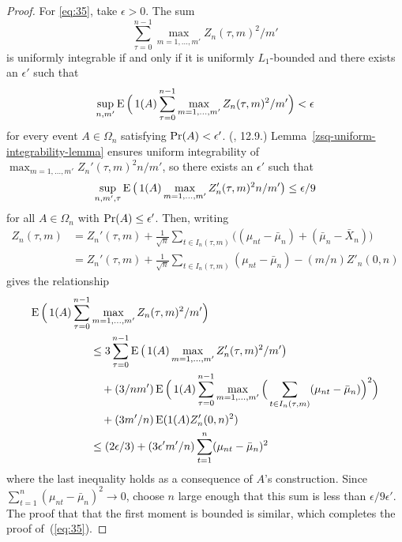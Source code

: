 \documentclass[11pt]{article}
\begin{document}
\begin{proof}
  For \eqref{eq:35}, take $\epsilon > 0$. The sum
  \[
  \sum_{\tau=0}^{n-1} \max_{m=1,\dots,m'} Z_n(\tau, m)^2 / m'
  \]
  is uniformly integrable if and only if it is uniformly $L_1$-bounded
  and there exists an $\epsilon'$ such that
  \[
  \sup_{n, m'} \operatorname{E}\Big( \operatorname{1}(A) \sum_{\tau=0}^{n-1} \max_{m=1,\dots,m'} Z_n(\tau, m)^2 / m' \Big)
  < \epsilon
  \]
  for every event $A \in \Omega_n$ satisfying $\operatorname{Pr}(A) < \epsilon'$.
  (\citealp{Dav:94}, 12.9.)
  Lemma~\ref{zsq-uniform-integrability-lemma} ensures uniform integrability of
  $\max_{m=1,\dots,m'} Z_n'(\tau, m)^2 n/m'$, so there exists an
  $\epsilon'$ such that
  \begin{equation*}
    \sup_{n, m', \tau} \operatorname{E}\big( \operatorname{1}(A) \max_{m=1,\dots,m'} Z_n'(\tau, m)^2 n / m' \big) \leq \epsilon / 9
  \end{equation*}
  for all $A \in \Omega_n$ with $\operatorname{Pr}(A) \leq \epsilon'$. Then, writing
  \begin{align*}
    Z_n(\tau, m) &= Z_n'(\tau, m)
    + \tfrac{1}{\sqrt{n}} \sum_{t \in I_n(\tau, m)}
    \big((\mu_{nt} - \bar \mu_n) + (\bar \mu_n - \bar X_n)\big) \\
    &= Z_n'(\tau, m)
    + \tfrac{1}{\sqrt{n}} \sum_{t \in I_n(\tau, m)} (\mu_{nt} - \bar \mu_n)
    - (m/n) Z'_n(0, n)
  \end{align*}
  gives the relationship
  \begin{align*}
    \operatorname{E}\Big(\operatorname{1}(A) \sum_{\tau=0}^{n-1} & \max_{m=1,\dots,m'} Z_n(\tau, m)^2/m'\Big) \\
    &\leq 3 \sum_{\tau=0}^{n-1} \operatorname{E}\big( \operatorname{1}(A)  \max_{m=1,\dots,m'} Z'_n(\tau, m)^2/m'\big) \\
    &\quad+(3/n m') \operatorname{E}\Big(\operatorname{1}(A) \sum_{\tau=0}^{n-1} \max_{m=1,\dots,m'}
    \Big(\sum_{t \in I_n(\tau, m)} (\mu_{nt} - \bar \mu_n) \Big)^2\Big) \\
    &\quad+ (3 m' / n) \operatorname{E} (\operatorname{1}(A) Z'_n(0, n)^2) \\
    &\leq (2 \epsilon/3) + (3 \epsilon' m' / n)\sum_{t=1}^n (\mu_{nt} - \bar \mu_n)^2
  \end{align*}
  where the last inequality holds as a consequence of $A$'s
  construction. Since $\sum_{t=1}^n (\mu_{nt} - \bar \mu_n)^2 \to
  0$, choose $n$ large enough that this sum is less than
  $\epsilon/9\epsilon'$. The proof that that the first moment is bounded is
  similar, which completes the proof of~(\ref{eq:35}).


\end{proof}
\end{document}
